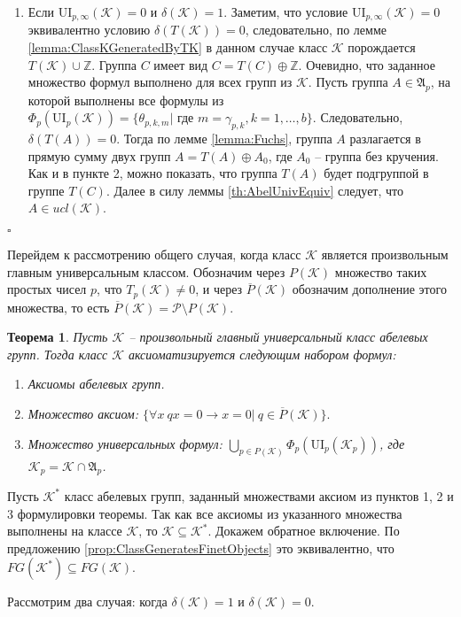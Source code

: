 \documentclass[a4paper,11pt,twoside]{article}
\newtheorem{theorem}{Теорема}[section]
\def\proof{{\noindent{\bf Доказательство.}} }
\def\A{{\mathfrak{A}}}
\def\K{{\mathcal{K}}}
\def\P{{\mathcal{P}}}
\def\Z{{\mathbb{Z}}}
\def\ui{{\mathrm{UI}}}
\begin{document}
\begin{enumerate}
\item Если $\ui_{p, \infty}(\K) = 0$ и $\delta(\K) = 1$. Заметим, что условие $\ui_{p, \infty}(\K) = 0$ эквивалентно условию $\delta(T(\K)) = 0$, следовательно, по лемме \ref{lemma:ClassKGeneratedByTK} в данном случае класс $\K$ порождается $T(\K) \cup \Z$. Группа $C$ имеет вид $C = T(C) \oplus \Z$. Очевидно, что заданное множество формул выполнено для всех групп из $\K$. Пусть группа $A \in \A_p$, на которой выполнены все формулы из $\Phi_p(\ui_p(\K)) = \{\theta_{p,k,m} | \text{ где } m = \gamma_{p,k}, k = 1, \ldots, b\}.$ Следовательно, $\delta(T(A)) = 0$. Тогда по лемме \ref{lemma:Fuchs}, группа $A$ разлагается в прямую сумму двух групп $A = T(A) \oplus A_0$, где $A_0$ -- группа без кручения. Как и в пункте 2, можно показать, что группа $T(A)$ будет подгруппой в группе $T(C)$. Далее в силу леммы \ref{th:AbelUnivEquiv} следует, что $A \in ucl(\K)$.
\end{enumerate} 
$\square$

Перейдем к рассмотрению общего случая, когда класс $\K$ является произвольным главным универсальным классом. Обозначим через $P(\K)$ множество таких простых чисел $p$, что $T_p(\K) \neq 0$, и через $\overline{P}(\K)$ обозначим дополнение этого множества, то есть $\overline{P}(\K) = \P \setminus P(\K).$

\begin{theorem}\label{th:AxiomsOfK}
Пусть $\K$ -- произвольный главный универсальный класс абелевых групп. Тогда класс $\K$ аксиоматизируется следующим набором формул:
\begin{enumerate}
\item Аксиомы абелевых групп.
\item Множество аксиом: $\{ \forall x \ qx = 0 \rightarrow x = 0 | \ q \in \overline{P}(\K) \}.$
\item Множество универсальных формул: $\bigcup\limits_{p \in P(\K)} \Phi_p(\ui_p(\K_p))$, где $\K_p = \K \cap \A_p$.
\end{enumerate}

\end{theorem}

\proof Пусть $\K^*$ класс абелевых групп, заданный множествами аксиом из пунктов 1, 2 и 3 формулировки  теоремы. Так как все аксиомы из указанного множества выполнены на классе $\K$, то $\K \subseteq \K^*$. Докажем обратное включение. По предложению \ref{prop:ClassGeneratesFinetObjects} это эквивалентно, что $FG(\K^*) \subseteq FG(\K)$. 

Рассмотрим два случая: когда $\delta(\K) = 1$ и $\delta(\K) = 0$.
\end{document}
